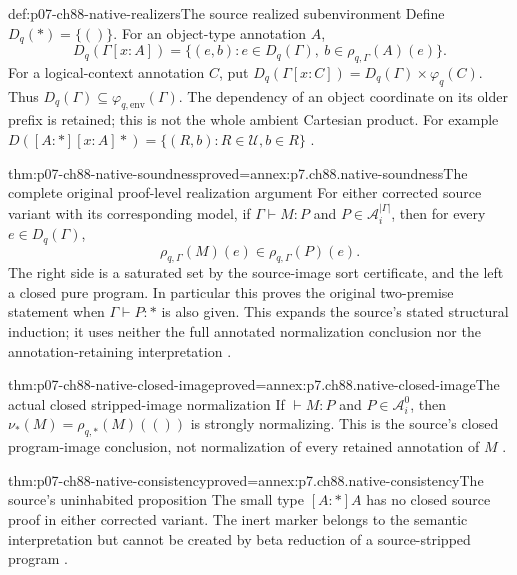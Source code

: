\begin{hbdefinition}{def:p07-ch88-native-realizers}{The source realized subenvironment}
Define \(D_q(\ast)=\{()\}\). For an object-type annotation \(A\),
\[
 D_q(\Gamma[x:A])=
 \{(e,b):e\in D_q(\Gamma),\ b\in\rho_{q,\Gamma}(A)(e)\}.
\]
For a logical-context annotation \(C\), put
\(D_q(\Gamma[x:C])=D_q(\Gamma)\times\varphi_q(C)\).
Thus \(D_q(\Gamma)\subseteq\varphi_{q,\mathrm{env}}(\Gamma)\).
The dependency of an object coordinate on its older prefix is retained;
this is not the whole ambient Cartesian product. For example
\(D([A:\ast][x:A]\ast)=\{(R,b):R\in\mathcal U, b\in R\}\)
\cite[\S5.3, p.~109]{CoquandHuet1988}.
\end{hbdefinition}

\begin{hbtheorem}{thm:p07-ch88-native-soundness}{proved=annex:p7.ch88.native-soundness}{The complete original proof-level realization argument}
For either corrected source variant with its corresponding model, if
\(\Gamma\vdash M:P\) and \(P\in\mathcal A_i^{|\Gamma|}\),
then for every \(e\in D_q(\Gamma)\),
\[
 \rho_{q,\Gamma}(M)(e)\in\rho_{q,\Gamma}(P)(e).
\]
The right side is a saturated set by the source-image sort certificate,
and the left a closed pure program. In particular this proves the original
two-premise statement when \(\Gamma\vdash P:\ast\) is also given.
This expands the source's stated structural induction; it uses neither
the full annotated normalization conclusion nor the annotation-retaining
interpretation \cite[\S5.4, p.~109]{CoquandHuet1988}.
\end{hbtheorem}

\begin{hbcorollary}{thm:p07-ch88-native-closed-image}{proved=annex:p7.ch88.native-closed-image}{The actual closed stripped-image normalization}
If \(\vdash M:P\) and \(P\in\mathcal A_i^0\), then
\(\nu_\ast(M)=\rho_{q,\ast}(M)(())\) is strongly normalizing.
This is the source's closed program-image conclusion, not normalization
of every retained annotation of \(M\) \cite[p.~110]{CoquandHuet1988}.
\end{hbcorollary}

\begin{hbtheorem}{thm:p07-ch88-native-consistency}{proved=annex:p7.ch88.native-consistency}{The source's uninhabited proposition}
The small type \([A:\ast]A\) has no closed source proof in either
corrected variant. The inert marker belongs to the semantic interpretation
but cannot be created by beta reduction of a source-stripped program
\cite[Corollary~2, p.~110]{CoquandHuet1988}.
\end{hbtheorem}

